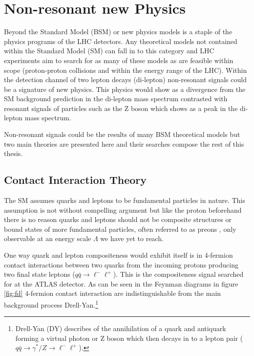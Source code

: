 


\section{Non-resonant new Physics}

    Beyond the Standard Model (BSM) or new physics models is a staple of the physics programs of the LHC detectors. Any theoretical models not contained within the Standard Model (SM) can fall in to this category and LHC experiments aim to search for as many of these models as are feasible within scope (proton-proton collisions and within the energy range of the LHC). Within the detection channel of two lepton decays (di-lepton) non-resonant signals could be a signature of new physics. This physics would show as a divergence from the SM background prediction in the di-lepton mass spectrum contrasted with resonant signals of particles such as the Z boson which shows as a peak in the di-lepton mass spectrum.

    Non-resonant signals could be the results of many BSM theoretical models but two main theories are presented here and their searches compose the rest of this thesis.


    \subsection{Contact Interaction Theory}
        \label{sec:CItheory}

        The SM assumes quarks and leptons to be fundamental particles in nature. This assumption is not without compelling argument but like the proton beforehand there is no reason quarks and leptons should not be composite structures or bound states of more fundamental particles, often referred to as preons \cite{Eichten:1983hw}, only observable at an energy scale $\Lambda$ we have yet to reach. 

        One way quark and lepton compositeness would exhibit itself is in 4-fermion contact interactions between two quarks from the incoming protons producing two final state leptons ($q\bar{q} \rightarrow \ell^{-}\ell^{+}$). This is the compositeness signal searched for at the ATLAS detector. As can be seen in the Feynman diagrams in figure \ref{fig:fd} 4-fermion contact interaction are indistinguishable from the main background process Drell-Yan.\footnote{Drell-Yan (DY) describes of the annihilation of a quark and antiquark forming a virtual photon or Z boson which then decays in to a lepton pair ($q\bar{q} \rightarrow \gamma^{*}/Z \rightarrow \ell^{-}\ell^{+}$).}

